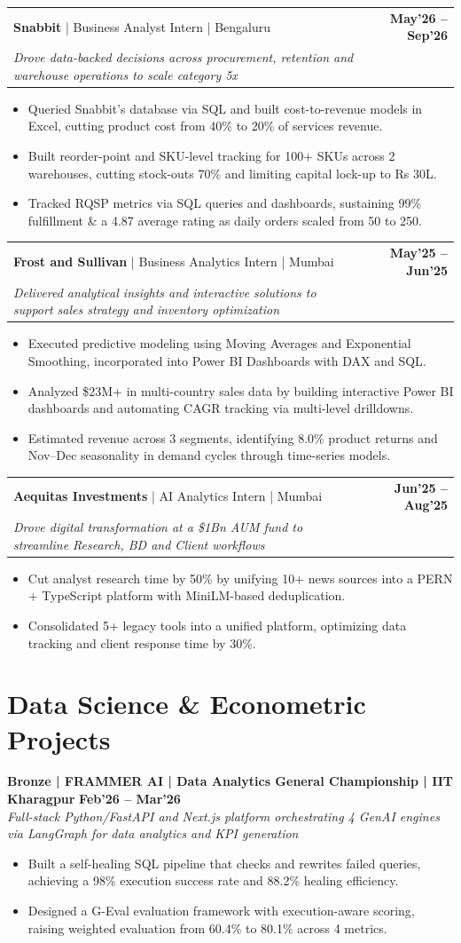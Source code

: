 \documentclass[10pt, a4paper]{article}
\makeatletter
\newcommand{\jobheader}[4]{
  \vspace{-1pt}
  \begin{tabular*}{\textwidth}[t]{l@{\extracolsep{\fill}}r}
    \textbf{#1} \quad | \quad #3 & \textbf{\small #4} \\
    \textit{\small #2} & \\
  \end{tabular*}
  \vspace{-2pt}
}
\newenvironment{achievelist}{
  \begin{itemize}[leftmargin=1.2em, itemsep=0.5pt, parsep=0pt, topsep=1pt]
    \small
}{
  \end{itemize}
  \vspace{-2pt}
}
\newcommand{\achieve}[1]{\item #1}
\makeatother
\begin{document}
\jobheader{Snabbit}{Drove data-backed decisions across procurement, retention and warehouse operations to scale category 5x}{Business Analyst Intern | Bengaluru}{May'26 -- Sep'26}
\begin{achievelist}
  \achieve{Queried Snabbit's database via SQL and built cost-to-revenue models in Excel, cutting product cost from 40\% to 20\% of services revenue.}
  \achieve{Built reorder-point and SKU-level tracking for 100+ SKUs across 2 warehouses, cutting stock-outs 70\% and limiting capital lock-up to Rs 30L.}
  \achieve{Tracked RQSP metrics via SQL queries and dashboards, sustaining 99\% fulfillment \& a 4.87 average rating as daily orders scaled from 50 to 250.}
\end{achievelist}

\jobheader{Frost and Sullivan}{Delivered analytical insights and interactive solutions to support sales strategy and inventory optimization}{Business Analytics Intern | Mumbai}{May'25 -- Jun'25}
\begin{achievelist}
  \achieve{Executed predictive modeling using Moving Averages and Exponential Smoothing, incorporated into Power BI Dashboards with DAX and SQL.}
  \achieve{Analyzed \$23M+ in multi-country sales data by building interactive Power BI dashboards and automating CAGR tracking via multi-level drilldowns.}
  \achieve{Estimated revenue across 3 segments, identifying 8.0\% product returns and Nov--Dec seasonality in demand cycles through time-series models.}
\end{achievelist}

\jobheader{Aequitas Investments}{Drove digital transformation at a \$1Bn AUM fund to streamline Research, BD and Client workflows}{AI Analytics Intern | Mumbai}{Jun'25 -- Aug'25}
\begin{achievelist}
  \achieve{Cut analyst research time by 50\% by unifying 10+ news sources into a PERN + TypeScript platform with MiniLM-based deduplication.}
  \achieve{Consolidated 5+ legacy tools into a unified platform, optimizing data tracking and client response time by 30\%.}
\end{achievelist}

\vspace{-2pt}

\section{Data Science \& Econometric Projects}

\textbf{Bronze | FRAMMER AI | Data Analytics General Championship | IIT Kharagpur} \hfill \textbf{\small Feb'26 -- Mar'26} \\
\textit{\small Full-stack Python/FastAPI and Next.js platform orchestrating 4 GenAI engines via LangGraph for data analytics and KPI generation}
\begin{achievelist}
  \achieve{Built a self-healing SQL pipeline that checks and rewrites failed queries, achieving a 98\% execution success rate and 88.2\% healing efficiency.}
  \achieve{Designed a G-Eval evaluation framework with execution-aware scoring, raising weighted evaluation from 60.4\% to 80.1\% across 4 metrics.}
\end{achievelist}
\end{document}

